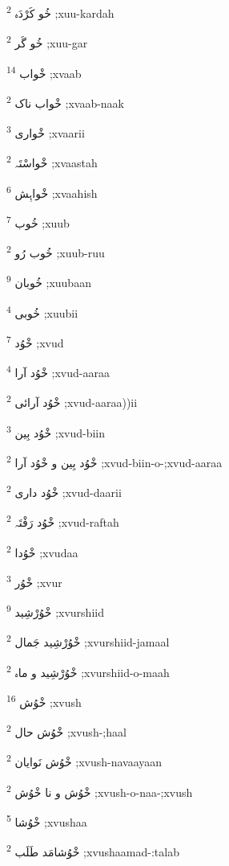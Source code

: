 \documentclass[12pt]{article}
\begin{document}
\begin{RTL}
\begin{multicols}{5}
{\ur خُو کَرْدَہ}   \textsuperscript{2} ;xuu-kardah

{\ur خُو گَر}   \textsuperscript{2} ;xuu-gar

{\ur خْواب}   \textsuperscript{14} ;xvaab

{\ur خْواب ناک}   \textsuperscript{2} ;xvaab-naak

{\ur خْواری}   \textsuperscript{3} ;xvaarii

{\ur خْواسْتَہ}   \textsuperscript{2} ;xvaastah

{\ur خْواہِش}   \textsuperscript{6} ;xvaahish

{\ur خُوب}   \textsuperscript{7} ;xuub

{\ur خُوب رُو}   \textsuperscript{2} ;xuub-ruu

{\ur خُوبان}   \textsuperscript{9} ;xuubaan

{\ur خُوبی}   \textsuperscript{4} ;xuubii

{\ur خْوُد}   \textsuperscript{7} ;xvud

{\ur خْوُد آرا}   \textsuperscript{4} ;xvud-aaraa

{\ur خْوُد آرائی}   \textsuperscript{2} ;xvud-aaraa))ii

{\ur خْوُد بِین}   \textsuperscript{3} ;xvud-biin

{\ur خْوُد بِین و خْوُد آرا}   \textsuperscript{2} ;xvud-biin-o-;xvud-aaraa

{\ur خْوُد داری}   \textsuperscript{2} ;xvud-daarii

{\ur خْوُد رَفْتَہ}   \textsuperscript{2} ;xvud-raftah

{\ur خْوُدا}   \textsuperscript{2} ;xvudaa

{\ur خْوُر}   \textsuperscript{3} ;xvur

{\ur خْوُرْشِید}   \textsuperscript{9} ;xvurshiid

{\ur خْوُرْشِید جَمال}   \textsuperscript{2} ;xvurshiid-jamaal

{\ur خْوُرْشِید و ماہ}   \textsuperscript{2} ;xvurshiid-o-maah

{\ur خْوُش}   \textsuperscript{16} ;xvush

{\ur خْوُش حال}   \textsuperscript{2} ;xvush-;haal

{\ur خْوُش نَوایان}   \textsuperscript{2} ;xvush-navaayaan

{\ur خْوُش و نا خْوُش}   \textsuperscript{2} ;xvush-o-naa-;xvush

{\ur خْوُشا}   \textsuperscript{5} ;xvushaa

{\ur خْوُشامَد طَلَب}   \textsuperscript{2} ;xvushaamad-:talab


\end{multicols}
\end{RTL}
\end{document}
